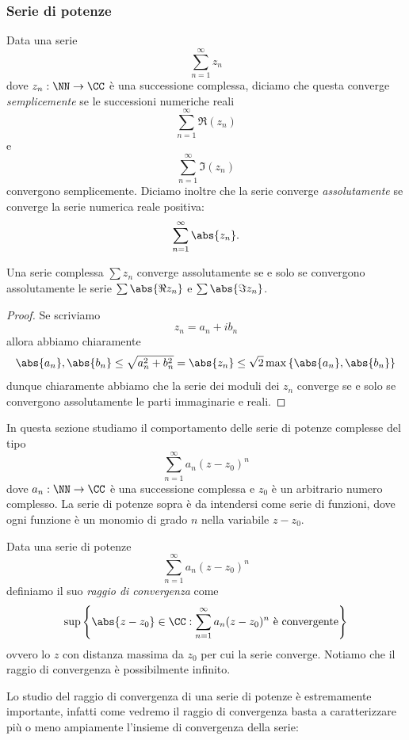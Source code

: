 \documentclass[11pt]{scrartcl}
\begin{document}
	\subsubsection{Serie di potenze}
	\begin{definition}
		Data una serie
		$$\sum_{n=1}^{\infty}z_n$$
		dove $z_n:\NN\to\CC$ è una successione complessa, diciamo che questa converge \textit{semplicemente} se le successioni numeriche reali
		$$\sum_{n=1}^{\infty}\Re(z_n)$$
		e
		$$\sum_{n=1}^{\infty}\Im(z_n)$$
		convergono semplicemente. Diciamo inoltre che la serie converge \textit{assolutamente} se converge la serie numerica reale positiva:
		$$\sum_{n=1}^{\infty}\abs{z_n}.$$
	\end{definition}
	\begin{lemma}
		Una serie complessa $\sum z_n$ converge assolutamente se e solo se convergono assolutamente le serie $\sum \abs{\Re z_n}$ e $\sum \abs{\Im z_n}$.
	\end{lemma}
	\begin{proof}
		Se scriviamo
		$$z_n=a_n+ib_n$$
		allora abbiamo chiaramente
		$$\abs{a_n},\abs{b_n}\le \sqrt{a_n^2+b_n^2}=\abs{z_n}\le \sqrt{2}\max\left\{\abs{a_n},\abs{b_n}\right\}$$
		dunque chiaramente abbiamo che la serie dei moduli dei $z_n$ converge se e solo se convergono assolutamente le parti immaginarie e reali.
	\end{proof}
	In questa sezione studiamo il comportamento delle serie di potenze complesse del tipo
	$$\sum_{n=1}^{\infty}a_n\left(z-z_0\right)^n$$
	dove $a_n:\NN\to\CC$ è una successione complessa e $z_0$ è un arbitrario numero complesso. La serie di potenze sopra è da intendersi come serie di funzioni, dove ogni funzione è un monomio di grado $n$ nella variabile $z-z_0$.
	\begin{definition}
		Data una serie di potenze 
		$$\sum_{n=1}^{\infty}a_n\left(z-z_0\right)^n$$
		definiamo il suo \textit{raggio di convergenza} come
		$$\sup\left\{\abs{z-z_0}\in \CC:\sum_{n=1}^{\infty}a_n(z-z_0)^n \text{ è convergente}\right\}$$
		ovvero lo $z$ con distanza massima da $z_0$ per cui la serie converge. Notiamo che il raggio di convergenza è possibilmente infinito.
	\end{definition}
	Lo studio del raggio di convergenza di una serie di potenze è estremamente importante, infatti come vedremo il raggio di convergenza basta a caratterizzare più o meno ampiamente l'insieme di convergenza della serie:
\end{document}
